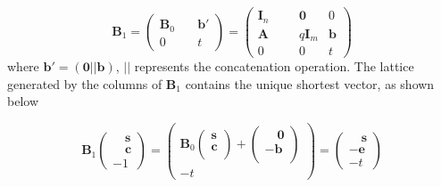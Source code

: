 \begin{equation*}
    \textbf{B}_1 =\begin{pmatrix}
        \pmb{B}_0 & \hspace{1em} \pmb{b}' \\
        0         & \hspace{1em}  t
    \end{pmatrix} =
    \begin{pmatrix}
        \pmb{I}_n &  &  & \pmb{0}    & 0       \\
        \pmb{A}   &  &  & q\pmb{I}_m & \pmb{b} \\
        0         &  &  & 0          & t
    \end{pmatrix}
\end{equation*}
where $\pmb{b}'=(\pmb{0}||\pmb{b})$, $||$ represents the concatenation operation. The lattice generated by the columns of $\pmb{B}_1$ contains the unique shortest vector, as shown below

\begin{equation*}
    \pmb{B}_1  \begin{pmatrix}
        \hspace{1em} \pmb{s} \\
        \hspace{1em} \pmb{c} \\
        -1
    \end{pmatrix} =
    \begin{pmatrix}
        \pmb{B}_0
        \begin{pmatrix}
            \pmb{s} \\
            \pmb{c} \\
        \end{pmatrix}+
        \begin{pmatrix}
            \hspace{1em} \pmb{0} \\
            \pmb{-b}             \\
        \end{pmatrix}
        \\
        -t
    \end{pmatrix} =
    \begin{pmatrix}
        \hspace{1em} \pmb{s} \\
        -\pmb{e}             \\
        -t
    \end{pmatrix}
\end{equation*}



